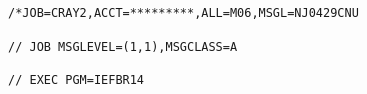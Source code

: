 \texttt{/*JOB=CRAY2,ACCT=*********,ALL=M06,MSGL=N}\qquad\texttt{J0429CNU}

\texttt{// JOB MSGLEVEL=(1,1),MSGCLASS=A}

\texttt{// EXEC PGM=IEFBR14}
